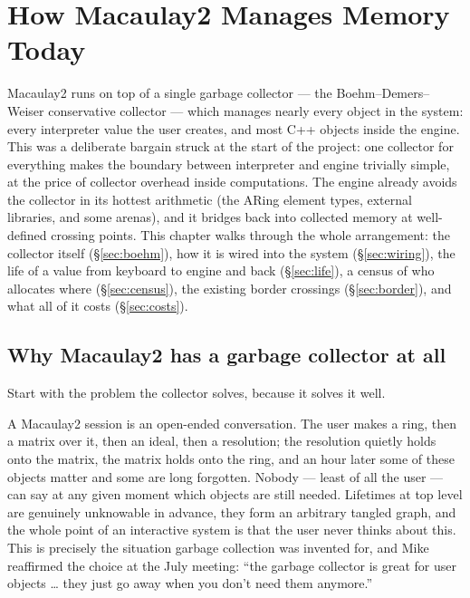 \documentclass[11pt,oneside]{report}
\begin{document}
\chapter{How Macaulay2 Manages Memory Today}
\label{ch:current}
\begin{inbrief}
Macaulay2 runs on top of a single garbage collector --- the
Boehm--Demers--Weiser conservative collector --- which manages nearly every
object in the system: every interpreter value the user creates, and most C++
objects inside the engine. This was a deliberate bargain struck at the start of
the project: one collector for everything makes the boundary between
interpreter and engine trivially simple, at the price of collector overhead
inside computations. The engine already avoids the collector in its hottest
arithmetic (the ARing element types, external libraries, and some arenas), and
it bridges back into collected memory at well-defined crossing points. This
chapter walks through the whole arrangement: the collector itself
(\S\ref{sec:boehm}), how it is wired into the system (\S\ref{sec:wiring}), the
life of a value from keyboard to engine and back (\S\ref{sec:life}), a census
of who allocates where (\S\ref{sec:census}), the existing border crossings
(\S\ref{sec:border}), and what all of it costs (\S\ref{sec:costs}).
\end{inbrief}

\section{Why Macaulay2 has a garbage collector at all}
\label{sec:why}

Start with the problem the collector solves, because it solves it well.

A Macaulay2 session is an open-ended conversation. The user makes a ring, then
a matrix over it, then an ideal, then a resolution; the resolution quietly
holds onto the matrix, the matrix holds onto the ring, and an hour later some
of these objects matter and some are long forgotten. Nobody --- least of all
the user --- can say at any given moment which objects are still needed.
Lifetimes at top level are genuinely unknowable in advance, they form an
arbitrary tangled graph, and the whole point of an interactive system is that
the user never thinks about this. This is precisely the situation garbage
collection was invented for, and Mike reaffirmed the choice at the July
meeting: ``the garbage collector is great for user objects \ldots{} they just
go away when you don't need them anymore.''
\end{document}
